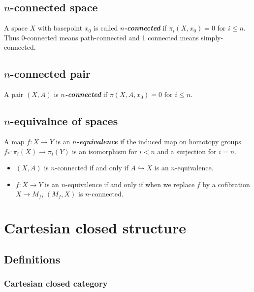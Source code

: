 \subsection{\texorpdfstring{$n$}{n}-connected space}

A space $X$ with basepoint $x_0$ is called \textbf{\textit{$n$-connected}} if $\pi_i(X,x_0)=0$ for $i\leq n$. Thus 0-connected means path-connected and 1 connected means simply-connected.

\subsection{\texorpdfstring{$n$}{n}-connected pair}

A pair $(X,A)$ is \textbf{\textit{$n$-connected}} if $\pi(X,A,x_0)=0$ for $i\leq n$.

\subsection{$n$-equivalnce of spaces}

A map $f:X\to Y$ is an \textit{\textbf{ $n$-equivalence}} if the induced map on homotopy groups $f_{*}:\pi_{i}(X)\to \pi_{i}(Y)$ is an isomorphism for $i<n$ and a surjection for $i=n$.

\begin{remark}\leavevmode
	\begin{itemize}
		\item $(X,A)$ is $n$-connected if and only if $A\hookrightarrow X$ is an $n$-equivalence.
		\item $f:X\to Y$ is an $n$-equivalence if and only if when we replace $f$ by a cofibration $X\to M_{f}$, $(M_{f},X)$ is $n$-connected.
	\end{itemize}
\end{remark}

\section{Cartesian closed structure}

\subsection{Definitions}

\subsubsection{Cartesian closed category}

